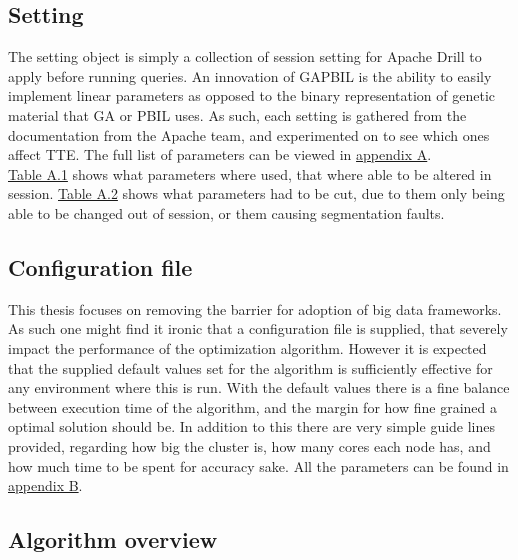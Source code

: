\documentclass[a4paper,english]{report}
\begin{document}
		\subsection{Setting}
		The setting object is simply a collection of session setting for Apache Drill to apply before running queries. An innovation of GAPBIL is the ability to easily implement linear parameters as opposed to the binary representation of genetic material that GA or PBIL uses. As such, each setting is gathered from the documentation from the Apache team, and experimented on to see which ones affect TTE. The full list of parameters can be viewed in \hyperref[system_params]{appendix A}. \\ \hyperref[table:added_params]{Table A.1} shows what parameters where used, that where able to be altered in session. \hyperref[table:removed_params]{Table A.2} shows what parameters had to be cut, due to them only being able to be changed out of session, or them causing segmentation faults. 
		\subsection{Configuration file}
			This thesis focuses on removing the barrier for adoption of big data frameworks. As such one might find it ironic that a configuration file is supplied, that severely impact the performance of the optimization algorithm. However it is expected that the supplied default values set for the algorithm is sufficiently effective for any environment where this is run. With the default values there is a fine balance between execution time of the algorithm, and the margin for how fine grained a optimal solution should be. In addition to this there are very simple guide lines provided, regarding how big the cluster is, how many cores each node has, and how much time to be spent for accuracy sake. All the parameters can be found in \hyperref[table:conf_params]{appendix B}.
			\clearpage
		\subsection{Algorithm overview}
\end{document}

